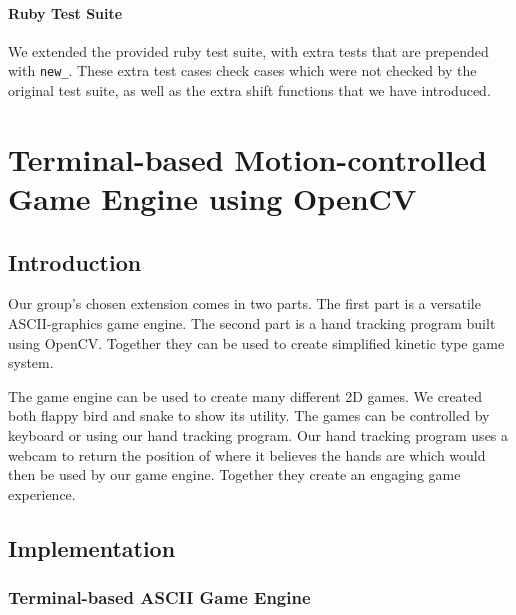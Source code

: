 \documentclass[10pt]{article}
\begin{document}
\paragraph{Ruby Test Suite}
We extended the provided ruby test suite, with extra tests that are prepended with \texttt{new\_}. These extra test cases check cases which were not checked by the original test suite, as well as the extra shift functions that we have introduced.

\section{Terminal-based Motion-controlled Game Engine using OpenCV}

\subsection{Introduction}

Our group’s chosen extension comes in two parts. The first part is a versatile ASCII-graphics game engine. The second part is a hand tracking program built using OpenCV. Together they can be used to create simplified kinetic type game system. 

The game engine can be used to create many different 2D games. We created both flappy bird and snake to show its utility. The games can be controlled by keyboard or using our hand tracking program. Our hand tracking program uses a webcam to return the position of where it believes the hands are which would then be used by our game engine. Together they create an engaging game experience.

\subsection{Implementation}

\subsubsection{Terminal-based ASCII Game Engine}
\end{document}
